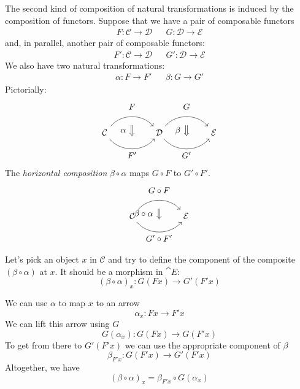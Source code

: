 \documentclass[DaoFP]{subfiles}
\begin{document}
The second kind of composition of natural transformations is induced by the composition of functors. Suppose that we have a pair of composable functors
\begin{align*}
 F \colon \mathcal{C} \to \mathcal{D}
&&G \colon \mathcal{D} \to \mathcal{E} 
\end{align*}
and, in parallel, another pair of composable functors:
\begin{align*}
 F' \colon \mathcal{C} \to \mathcal{D}
&& G' \colon \mathcal{D} \to \mathcal{E} 
\end{align*}
We also have two natural transformations:
\begin{align*}
\alpha \colon F \to F'  
&& \beta \colon G \to G' 
\end{align*}
Pictorially:
\[
\begin{tikzcd}[column sep=huge]
\mathcal{C}
  \arrow[bend left=50]{r}[name=U, label=above:$F$]{}
  \arrow[bend right=50]{r}[name=D, label=below:$F'$]{} 
 &
\mathcal{D}
  \arrow[bend left=50]{r}[name=U1, label=above:$G$]{}
  \arrow[bend right=50]{r}[name=D1, label=below:$G'$]{} 
 &
\mathcal{E}
  \arrow[shorten <=10pt,shorten >=10pt,Rightarrow,to path={(U) -- node[label=left:$\alpha$] {} (D)}]{}
  \arrow[shorten <=10pt,shorten >=10pt,Rightarrow,to path={(U1) -- node[label=left:$\beta$] {} (D1)}]{}
\end{tikzcd}
\]
The \emph{horizontal composition} $\beta \circ \alpha$ maps $G \circ F$ to $G' \circ F'$.
\[
\begin{tikzcd}[column sep=huge]
\mathcal{C}
  \arrow[bend left=50]{r}[name=U, label=above:$G \circ F$]{}
  \arrow[bend right=50]{r}[name=D, label=below:$G' \circ F'$]{} 
 &
\mathcal{E}
  \arrow[shorten <=10pt,shorten >=10pt,Rightarrow,to path={(U) -- node[label=left:$\beta \circ \alpha$] {} (D)}]{}
\end{tikzcd}
\]


Let's pick an object $x$ in $\mathcal{C}$ and try to define the component of the composite $(\beta \circ \alpha)$ at $x$. It should be a morphism in $\cat E$:
\[ (\beta \circ \alpha)_x \colon G ( F x) \to G' ( F' x) \]

We can use $\alpha$ to map $x$ to an arrow 
\[ \alpha_x \colon F x \to F' x \]
We can lift this arrow using $G$
\[ G (\alpha_x) \colon G (F x) \to G (F' x) \]
To get from there to $G' (F' x)$ we can use the appropriate component of $\beta$
\[ \beta_{F' x} \colon G (F' x) \to G' (F' x) \]
Altogether, we have
\[ (\beta \circ \alpha)_x = \beta_{F' x} \circ G (\alpha_x) \]
\end{document}
